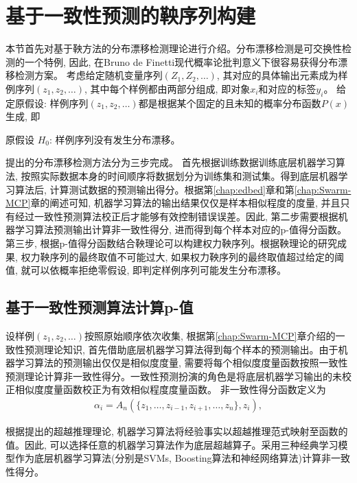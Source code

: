 \section{基于一致性预测的鞅序列构建}

本节首先对基于鞅方法的分布漂移检测理论进行介绍。分布漂移检测是可交换性检测的一个特例, 因此, 在Bruno de Finetti现代概率论批判意义下很容易获得分布漂移检测方案。 考虑给定随机变量序列$(Z_1,Z_2,\ldots)$, 其对应的具体输出元素成为样例序列$(z_1, z_2,\ldots)$, 其中每个样例都由两部分组成, 即对象$x_i$和对应的标签$y_i$。 给定原假设: 样例序列$(z_1, z_2, \ldots)$都是根据某个固定的且未知的概率分布函数$P(x)$生成, 即
\begin{center}
\textsf{原假设 $H_0$}: 样例序列没有发生分布漂移。
\end{center}

提出的分布漂移检测方法分为三步完成。 首先根据训练数据训练底层机器学习算法, 按照实际数据本身的时间顺序将数据划分为训练集和测试集。得到底层机器学习算法后, 计算测试数据的预测输出得分。根据第\ref{chap:edbed}章和第\ref{chap:Swarm-MCP}章的阐述可知, 机器学习算法的输出结果仅仅是样本相似程度的度量, 并且只有经过一致性预测算法校正后才能够有效控制错误误差。因此, 第二步需要根据机器学习算法预测输出计算非一致性得分, 进而得到每个样本对应的p-值得分函数。第三步, 根据p-值得分函数结合鞅理论可以构建权力鞅序列。根据鞅理论的研究成果, 权力鞅序列的最终取值不可能过大, 如果权力鞅序列的最终取值超过给定的阈值, 就可以依概率拒绝零假设, 即判定样例序列可能发生分布漂移。

\subsection{基于一致性预测算法计算p-值}
设样例$(z_1,z_2,\ldots)$按照原始顺序依次收集, 根据第\ref{chap:Swarm-MCP}章介绍的一致性预测理论知识, 首先借助底层机器学习算法得到每个样本的预测输出。由于机器学习算法的预测输出仅仅是相似度度量, 需要将每个相似度度量函数按照一致性预测理论计算非一致性得分。一致性预测扮演的角色是将底层机器学习输出的未校正相似度度量函数校正为有效相似程度度量函数。 非一致性得分函数定义为
\begin{align}
\label{alpha-4.1}
\alpha_{i} = A_{n}(\{z_1,\ldots,z_{i-1},z_{i+1},\ldots,z_{n}\}, z_{i}),
\end{align}

根据\citet{vapnik1995,vapnik1998}提出的超越推理理论, 机器学习算法将经验事实以超越推理范式映射至函数的值。因此, 可以选择任意的机器学习算法作为底层超越算子。采用三种经典学习模型作为底层机器学习算法(分别是SVMs, Boosting算法和神经网络算法)计算非一致性得分。

